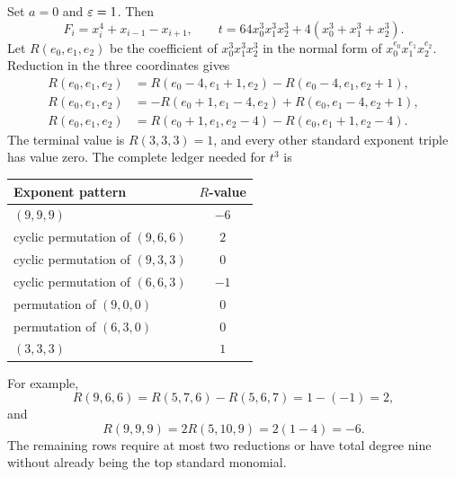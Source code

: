 \documentclass[11pt]{article}
\theoremstyle{definition}
\theoremstyle{remark}
\begin{document}
Set \(a=0\) and \(\varepsilon=1\).  Then
\[
F_i=x_i^4+x_{i-1}-x_{i+1},
\qquad
t=64x_0^3x_1^3x_2^3+4(x_0^3+x_1^3+x_2^3).
\]
Let \(R(e_0,e_1,e_2)\) be the coefficient of
\(x_0^3x_1^3x_2^3\) in the normal form of
\(x_0^{e_0}x_1^{e_1}x_2^{e_2}\).  Reduction in the three coordinates gives
\begin{equation}
\begin{aligned}
R(e_0,e_1,e_2)
&=R(e_0-4,e_1+1,e_2)-R(e_0-4,e_1,e_2+1),\\
R(e_0,e_1,e_2)
&=-R(e_0+1,e_1-4,e_2)+R(e_0,e_1-4,e_2+1),\\
R(e_0,e_1,e_2)
&=R(e_0+1,e_1,e_2-4)-R(e_0,e_1+1,e_2-4).
\end{aligned}
\label{eq:quartic-R}
\end{equation}
The terminal value is \(R(3,3,3)=1\), and every other standard exponent
triple has value zero.  The complete ledger needed for \(t^3\) is
\begin{center}
\begin{tabular}{lc}
\toprule
Exponent pattern & \(R\)-value\\
\midrule
\((9,9,9)\) & \(-6\)\\
cyclic permutation of \((9,6,6)\) & \(2\)\\
cyclic permutation of \((9,3,3)\) & \(0\)\\
cyclic permutation of \((6,6,3)\) & \(-1\)\\
permutation of \((9,0,0)\) & \(0\)\\
permutation of \((6,3,0)\) & \(0\)\\
\((3,3,3)\) & \(1\)\\
\bottomrule
\end{tabular}
\end{center}
For example,
\[
R(9,6,6)=R(5,7,6)-R(5,6,7)=1-(-1)=2,
\]
and
\[
R(9,9,9)=2R(5,10,9)=2(1-4)=-6.
\]
The remaining rows require at most two reductions or have total degree nine
without already being the top standard monomial.
\end{document}
